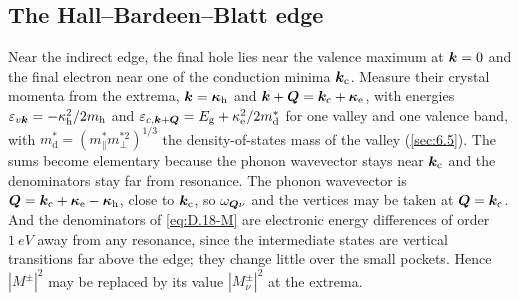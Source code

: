 \subsection*{The Hall--Bardeen--Blatt edge}

Near the indirect edge, the final hole lies near the valence maximum at $\bm{k} = 0$ and the final electron near one of the conduction minima $\bm{k}_{\mathrm{c}}$. Measure their crystal momenta from the extrema, $\bm{k} = \bm{\kappa}_{\mathrm{h}}$ and $\bm{k} + \bm{Q} = \bm{k}_{\mathrm{c}} + \bm{\kappa}_{\mathrm{e}}$, with energies $\varepsilon_{v\bm{k}} = -\kappa_{\mathrm{h}}^2/2m_{\mathrm{h}}$ and $\varepsilon_{c,\bm{k}+\bm{Q}} = E_{\mathrm{g}} + \kappa_{\mathrm{e}}^2/2m^*_{\mathrm{d}}$ for one valley and one valence band, with $m^*_{\mathrm{d}} = (m^*_\parallel m^{*2}_\perp)^{1/3}$ the density-of-states mass of the valley (\cref{sec:6.5}). The sums become elementary because the phonon wavevector stays near $\bm{k}_{\mathrm{c}}$ and the denominators stay far from resonance. The phonon wavevector is $\bm{Q} = \bm{k}_{\mathrm{c}} + \bm{\kappa}_{\mathrm{e}} - \bm{\kappa}_{\mathrm{h}}$, close to $\bm{k}_{\mathrm{c}}$, so $\omega_{\bm{Q}\nu}$ and the vertices may be taken at $\bm{Q} = \bm{k}_{\mathrm{c}}$. And the denominators of \cref{eq:D.18-M} are electronic energy differences of order $\SI{1}{eV}$ away from any resonance, since the intermediate states are vertical transitions far above the edge; they change little over the small pockets. Hence $|M^\pm|^2$ may be replaced by its value $|M^\pm_\nu|^2$ at the extrema.


